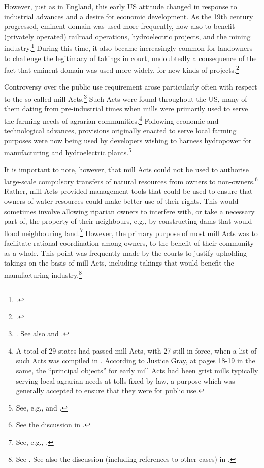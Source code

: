 However, just as in England, this early US attitude changed in response to industrial advances and a desire for economic development. As the 19th century progressed, eminent domain was used more frequently, now also to benefit (privately operated) railroad operations, hydroelectric projects, and the mining industry.\footcite[23-33]{meidinger80} During this time, it also became increasingly common for landowners to challenge the legitimacy of takings in court, undoubtedly a consequence of the fact that eminent domain was used more widely, for new kinds of projects.\footcite[24]{meidinger80} 

Controversy over the public use requirement arose particularly often with respect to the so-called mill Acts.\footnote{\cite[24]{meidinger80}. See also \cite[306-313]{johnson11} and \cite[251-252]{horwitz73}.} Such Acts were found throughout the US, many of them dating from pre-industrial times when mills were primarily used to serve the farming needs of agrarian communities.\footnote{A total of 29 states had passed mill Acts, with 27 still in force, when a list of such Acts was compiled in \cite[17]{head85}. According to Justice Gray, at pages 18-19 in the same, the ``principal objects'' for early mill Acts had been grist mills typically serving local agrarian needs at tolls fixed by law, a purpose which was generally accepted to ensure that they were for public use.} Following economic and technological advances, provisions originally enacted to serve local farming purposes were now being used by developers wishing to harness hydropower for manufacturing and hydroelectric plants.\footnote{See, e.g., \cite[18-21]{head85} and \cite[449-452]{minn06}.}

It is important to note, however, that mill Acts could not be used to authorise large-scale compulsory transfers of natural resources from owners to non-owners.\footnote{See the discussion in \cite{head85}.} Rather, mill Acts provided management tools that could be used to ensure that owners of water resources could make better use of their rights. This would sometimes involve allowing riparian owners to interfere with, or take a necessary part of, the property of their neighbours, e.g., by constructing dams that would flood neighbouring land.\footnote{See, e.g., \cite[265]{staples03}.} However, the primary purpose of most mill Acts was to facilitate rational coordination among owners, to the benefit of their community as a whole. This point was frequently made by the courts to justify upholding takings on the basis of mill Acts, including takings that would benefit the manufacturing industry.\footnote{See \cite{fiske31}. See also the discussion (including references to other cases) in \cite{head85}.}

